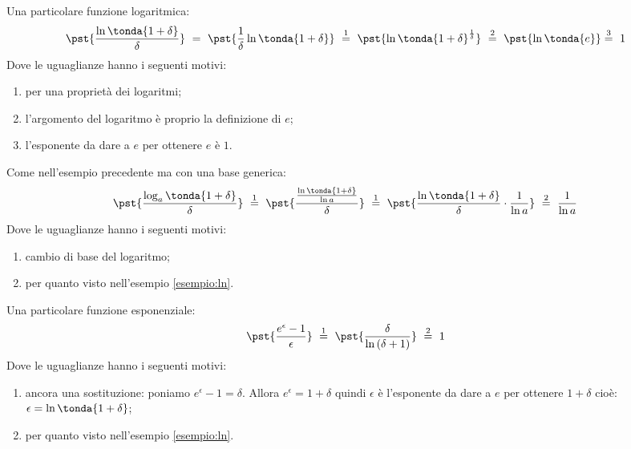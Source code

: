 \begin{esempio}
\label{esempio:ln}
Una particolare funzione logaritmica:
\begin{align*}
 &\pst{\dfrac{\ln\tonda{1+\delta}}{\delta}}~ = ~  
 \pst{\frac{1}{\delta}\ln\tonda{1+\delta}} ~\stackrel{1}{=} ~
 \pst{\ln\tonda{1+\delta}^\frac{1}{\delta}}
~ \stackrel{2}{=} ~
\pst{\ln\tonda{e}} \stackrel{3}{=} ~ 1
\end{align*}
Dove le uguaglianze hanno i seguenti motivi:
\begin{enumerate} [nosep]
 \item per una proprietà dei logaritmi;
 \item l'argomento del logaritmo è proprio la definizione di \(e\);
 \item l'esponente da dare a \(e\) per ottenere \(e\) è \(1\).
\end{enumerate}
\end{esempio}

\begin{esempio}
\label{esempio:log_a}
Come nell'esempio precedente ma con una base generica:
\begin{align*}
 &\pst{\dfrac{\log_a\tonda{1+\delta}}{\delta}}~\stackrel{1}{=} ~  
 \pst{\dfrac{\frac{\ln\tonda{1+\delta}}{\ln a}}{\delta}}~\stackrel{1}{=} ~
 \pst{\dfrac{\ln\tonda{1+\delta}}{\delta}\cdot \dfrac{1}{\ln a}}
 ~ \stackrel{2}{=} ~
 \dfrac{1}{\ln a}
\end{align*}
Dove le uguaglianze hanno i seguenti motivi:
\begin{enumerate} [nosep]
 \item cambio di base del logaritmo;
 \item per quanto visto nell'esempio \ref{esempio:ln}.
\end{enumerate}
\end{esempio}


\begin{esempio}
Una particolare funzione esponenziale:
\begin{align*}
&\pst{\dfrac{e^\epsilon-1}{\epsilon}}
~ \stackrel{1}{=} ~  
\pst{\dfrac{\delta}{\ln{(\delta+1)}}}~ \stackrel{2}{=} ~ 1
\end{align*}
Dove le uguaglianze hanno i seguenti motivi:
\begin{enumerate} [nosep]
 \item ancora una sostituzione: poniamo \(e^\epsilon-1=\delta\). 
Allora \(e^\epsilon = 1+\delta\) quindi \(\epsilon\) è l'esponente da dare 
a \(e\) per ottenere \(1+\delta\) cioè: 
\(\epsilon = \ln{\tonda{1+\delta}}\);
 \item per quanto visto nell'esempio \ref{esempio:ln}.
\end{enumerate}
\end{esempio}

